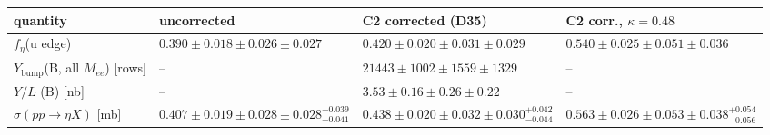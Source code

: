 \begin{tabular}{llll}
\hline
 quantity & uncorrected & C2 corrected (D35) & C2 corr., $\kappa=0.48$ \\
\hline
 $f_\eta$(u edge) & $0.390\pm0.018\pm0.026\pm0.027$ & $0.420\pm0.020\pm0.031\pm0.029$ & $0.540\pm0.025\pm0.051\pm0.036$ \\
 $Y_{\mathrm{bump}}$(B, all $M_{ee}$) [rows] & -- & $21443\pm1002\pm1559\pm1329$ & -- \\
 $Y/L$ (B) [nb] & -- & $3.53\pm0.16\pm0.26\pm0.22$ & -- \\
 $\sigma(pp\to\eta X)$ [mb] & $0.407\pm0.019\pm0.028\pm0.028^{+0.039}_{-0.041}$ & $0.438\pm0.020\pm0.032\pm0.030^{+0.042}_{-0.044}$ & $0.563\pm0.026\pm0.053\pm0.038^{+0.054}_{-0.056}$ \\
\hline
\end{tabular}
